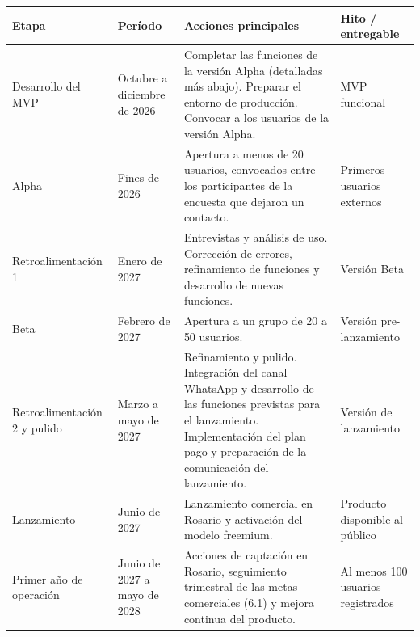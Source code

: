 {\def\LTcaptype{none} %
\begin{longtable}[]{@{}
  >{\raggedright\arraybackslash}p{}
  >{\raggedright\arraybackslash}p{}
  >{\raggedright\arraybackslash}p{}
  >{\raggedright\arraybackslash}p{}@{}}
\toprule\noalign{}
\begin{minipage}[b]{\linewidth}\raggedright
Etapa
\end{minipage} & \begin{minipage}[b]{\linewidth}\raggedright
Período
\end{minipage} & \begin{minipage}[b]{\linewidth}\raggedright
Acciones principales
\end{minipage} & \begin{minipage}[b]{\linewidth}\raggedright
Hito / entregable
\end{minipage} \\
\midrule\noalign{}
\endhead
\bottomrule\noalign{}
\endlastfoot
Desarrollo del MVP & Octubre a diciembre de 2026 & Completar las
funciones de la versión Alpha (detalladas más abajo). Preparar el
entorno de producción. Convocar a los usuarios de la versión Alpha. &
MVP funcional \\
Alpha & Fines de 2026 & Apertura a menos de 20 usuarios, convocados
entre los participantes de la encuesta que dejaron un contacto. &
Primeros usuarios externos \\
Retroalimentación 1 & Enero de 2027 & Entrevistas y análisis de uso.
Corrección de errores, refinamiento de funciones y desarrollo de nuevas
funciones. & Versión Beta \\
Beta & Febrero de 2027 & Apertura a un grupo de 20 a 50 usuarios. &
Versión pre-lanzamiento \\
Retroalimentación 2 y pulido & Marzo a mayo de 2027 & Refinamiento y
pulido. Integración del canal WhatsApp y desarrollo de las funciones
previstas para el lanzamiento. Implementación del plan pago y
preparación de la comunicación del lanzamiento. & Versión de
lanzamiento \\
Lanzamiento & Junio de 2027 & Lanzamiento comercial en Rosario y
activación del modelo freemium. & Producto disponible al público \\
Primer año de operación & Junio de 2027 a mayo de 2028 & Acciones de
captación en Rosario, seguimiento trimestral de las metas comerciales
(6.1) y mejora continua del producto. & Al menos 100 usuarios
registrados \\
\end{longtable}
}

